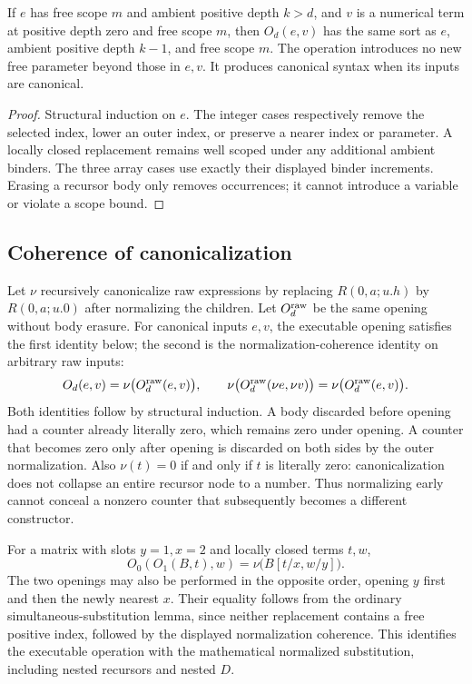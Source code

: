\begin{lemma}
If $e$ has free scope $m$ and ambient positive depth $k>d$, and $v$ is a numerical term
at positive depth zero and free scope $m$, then $O_d(e,v)$ has the same
sort as $e$, ambient positive depth $k-1$, and free scope $m$.
The operation introduces no new free parameter beyond those in $e,v$.
It produces canonical syntax when its inputs are canonical.
\end{lemma}
\begin{proof}
Structural induction on $e$. The integer cases respectively remove the
selected index, lower an outer index, or preserve a nearer index or
parameter. A locally closed replacement remains well scoped under any
additional ambient binders. The three array cases use exactly their
displayed binder increments. Erasing a recursor body only removes
occurrences; it cannot introduce a variable or violate a scope bound.
\end{proof}

\subsection{Coherence of canonicalization}

Let $\nu$ recursively canonicalize raw expressions by replacing
$R(0,a;u.h)$ by $R(0,a;u.0)$ after normalizing the children. Let
$O_d^{\rm raw}$ be the same opening without body erasure. For canonical
inputs $e,v$, the executable opening satisfies the first identity below;
the second is the normalization-coherence identity on arbitrary raw inputs:
\[
 O_d(e,v)=\nu\bigl(O_d^{\rm raw}(e,v)\bigr),
 \qquad
 \nu\bigl(O_d^{\rm raw}(\nu e,\nu v)\bigr)
 =\nu\bigl(O_d^{\rm raw}(e,v)\bigr).
\]
Both identities follow by structural induction. A body discarded before
opening had a counter already literally zero, which remains zero under
opening. A counter that becomes zero only after opening is discarded on
both sides by the outer normalization. Also $\nu(t)=0$ if and only if
$t$ is literally zero: canonicalization does not collapse an entire
recursor node to a number. Thus normalizing early cannot conceal a
nonzero counter that subsequently becomes a different constructor.

For a matrix with slots $y=1,x=2$ and locally closed terms $t,w$,
\[
 O_0(O_1(B,t),w)
 =\nu\bigl(B[t/x,w/y]\bigr).
\]
The two openings may also be performed in the opposite order, opening
$y$ first and then the newly nearest $x$. Their equality follows from
the ordinary simultaneous-substitution lemma, since neither replacement
contains a free positive index, followed by the displayed normalization
coherence. This identifies the executable operation with the mathematical
normalized substitution, including nested recursors and nested $D$.

